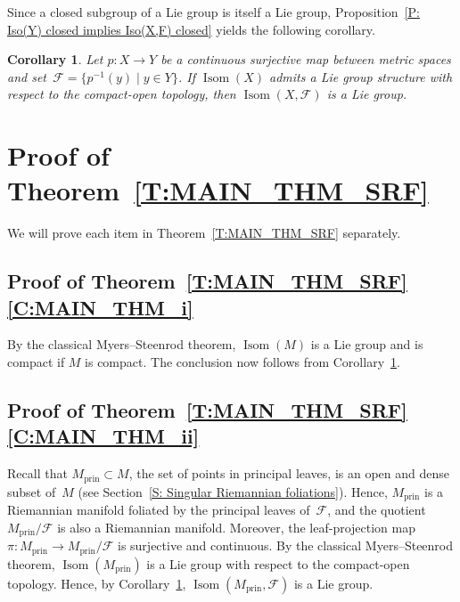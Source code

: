 \documentclass[10pt,a4paper]{amsart}
\numberwithin{equation}{section}
\newtheorem{cor}[thm]{Corollary}
\theoremstyle{definition}
\DeclareMathOperator{\Iso}{Isom}
\newcommand{\prin}{\mathrm{prin}}
\newcommand{\fol}{\mathcal{F}}
\begin{document}
Since a closed subgroup of a Lie group is itself a Lie group, Proposition~\ref{P: Iso(Y) closed implies Iso(X,F) closed} yields the following corollary.



\begin{cor}\label{C: Lie group Iso(Y) and closed implies Lie group Iso(M,F)}
Let $p\colon X\to Y$ be a continuous surjective map between metric spaces
and set~${\fol = \{p^{-1}(y)\mid y\in Y\}}$. If $\Iso(X)$ admits a Lie group structure with respect to the compact-open topology, then $\Iso (X,\fol)$ is a Lie group.
\end{cor}


\section[Proof of Theorem A]{Proof of Theorem~\ref{T:MAIN_THM_SRF}}\label{S: proof of Main corollary}
We will prove each item in Theorem~\ref{T:MAIN_THM_SRF} separately.



\subsection[Proof of Theorem A (i)]{Proof of Theorem~\ref{T:MAIN_THM_SRF}\,\ref{C:MAIN_THM_i}}
By the classical Myers--Steenrod theorem, $\Iso(M)$
is a Lie group and is compact if $M$ is compact. The conclusion now follows from Corollary~\ref{C: Lie group Iso(Y) and closed implies Lie group Iso(M,F)}.




\subsection[Proof of Theorem A (ii)]{Proof of Theorem~\ref{T:MAIN_THM_SRF}\,\ref{C:MAIN_THM_ii}}

Recall that $M_\prin\subset M$, the set of points in principal leaves, is an open and dense subset of~$M$ (see Section~\ref{S: Singular Riemannian foliations}).
Hence, $M_\prin$ is a Riemannian manifold foliated by the principal leaves of~$\fol$, and the quotient $M_\prin/\fol$ is also a Riemannian manifold.
Moreover, the leaf-projection map~${\pi\colon M_\prin\to M_\prin/\fol}$ is surjective and continuous.
By the classical Myers--Steenrod theorem, $\Iso(M_\prin)$ is a Lie group with respect to the compact-open topology. Hence, by Corollary~\ref{C: Lie group Iso(Y) and closed implies Lie group Iso(M,F)}, $\Iso(M_\prin,\fol)$ is a Lie group.
\end{document}

